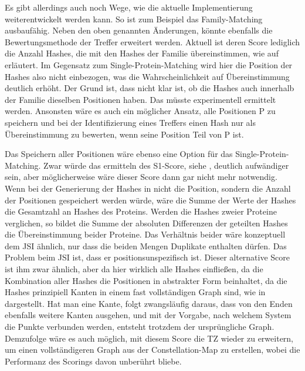         Es gibt allerdings auch noch Wege, wie die aktuelle Implementierung weiterentwickelt werden kann. So ist zum Beispiel das Family-Matching ausbaufähig. Neben den oben genannten Änderungen, könnte ebenfalls die Bewertungsmethode der Treffer erweitert werden. Aktuell ist deren Score lediglich die Anzahl Hashes, die mit den Hashes der Familie übereinstimmen, wie auf  erläutert. Im Gegensatz zum Single-Protein-Matching wird hier die Position der Hashes also nicht einbezogen, was die Wahrscheinlichkeit auf Übereinstimmung deutlich erhöht. Der Grund ist, dass nicht klar ist, ob die Hashes auch innerhalb der Familie dieselben Positionen haben. Das müsste experimentell ermittelt werden. Ansonsten wäre es auch ein möglicher Ansatz, alle Positionen P zu speichern und bei der Identifizierung eines Treffers einen Hash nur als Übereinstimmung zu bewerten, wenn seine Position Teil von P ist.

        Das Speichern aller Positionen wäre ebenso eine Option für das Single-Protein-Matching. Zwar würde das ermitteln des S1-Score, siehe , deutlich aufwändiger sein, aber möglicherweise wäre dieser Score dann gar nicht mehr notwendig. Wenn bei der Generierung der Hashes in  nicht die Position, sondern die Anzahl der Positionen gespeichert werden würde, wäre die Summe der Werte der Hashes die Gesamtzahl an Hashes des Proteins. Werden die Hashes zweier Proteine verglichen, so bildet die Summe der absoluten Differenzen der geteilten Hashes die Übereinstimmung beider Proteine. Das Verhältnis beider wäre konzeptuell dem \ac{JSI} ähnlich, nur dass die beiden Mengen Duplikate enthalten dürfen. Das Problem beim \ac{JSI} ist, dass er positionsunspezifisch ist. Dieser alternative Score ist ihm zwar ähnlich, aber da hier wirklich alle Hashes einfließen, da die Kombination aller Hashes die Positionen in abstrakter Form beinhaltet, da die Hashes prinzipiell Kanten in einem fast vollständigen Graph sind, wie in  dargestellt. Hat man eine Kante, folgt zwangsläufig daraus, dass von den Enden ebenfalls weitere Kanten ausgehen, und mit der Vorgabe, nach welchem System die Punkte verbunden werden, entsteht trotzdem der ursprüngliche Graph. Demzufolge wäre es auch möglich, mit diesem Score die \ac{TZ} wieder zu erweitern, um einen vollständigeren Graph aus der Constellation-Map zu erstellen, wobei die Performanz des Scorings davon unberührt bliebe.


